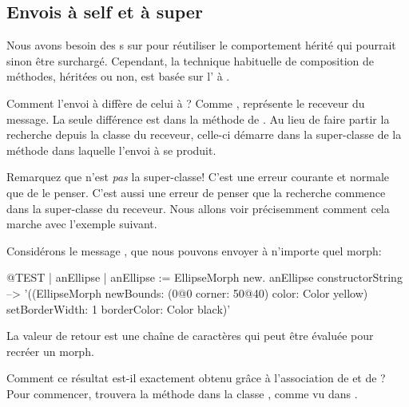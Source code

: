 \documentclass[a4paper,10pt,twoside]{book}
\begin{document}
\subsection{Envois à self et à super}

Nous avons besoin des s sur \super pour 
réutiliser le comportement hérité qui pourrait sinon être
surchargé.
Cependant, la technique habituelle de composition de méthodes,
héritées ou non, est basée sur l' à
\self.

Comment l'envoi à \self diffère de celui à \super?
Comme \self, \super représente le receveur du message.
La seule différence est dans la méthode de .
Au lieu de faire partir la recherche depuis la classe du receveur,
celle-ci démarre dans la super-classe de la méthode dans laquelle
l'envoi à \super se produit. 

Remarquez que \super n'est \emph{pas} la super-classe!
C'est une erreur courante et normale que de le penser.
C'est aussi une erreur de penser que la recherche commence dans la super-classe du receveur.
Nous allons voir précisemment comment cela marche avec l'exemple suivant.

Considérons le message , que nous pouvons envoyer à 
n'importe quel morph:
\begin{code}{@TEST | anEllipse | anEllipse := EllipseMorph new.}
anEllipse constructorString --> '((EllipseMorph newBounds: (0@0 corner: 50@40) color: Color yellow) setBorderWidth: 1 borderColor: Color black)'
\end{code}
La valeur de retour est une chaîne de caractères qui peut être évaluée pour recréer un morph.

Comment ce résultat est-il exactement obtenu grâce à l'association de \self et de \super?
Pour commencer, 
 trouvera la méthode  dans la 
classe ,
comme vu dans .
\end{document}
